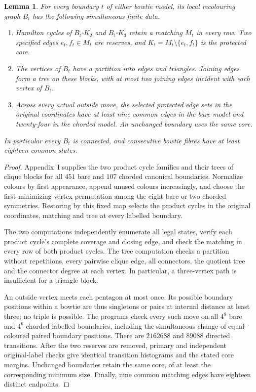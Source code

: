 \documentclass[11pt]{article}
\newtheorem{lemma}[theorem]{Lemma}
\theoremstyle{remark}
\numberwithin{equation}{section}
\numberwithin{table}{section}
\begin{document}
\begin{lemma}\label{lem:bowtie-product-data}
For every boundary $t$ of either bowtie model, its local recolouring
graph $B_t$ has the following simultaneous finite data.
\begin{enumerate}
\item Hamilton cycles of $B_t\square K_2$ and $B_t\square K_3$
retain a matching $M_t$ in every row. Two specified edges
$e_t,f_t\in M_t$ are reserves, and $K_t=M_t\setminus\{e_t,f_t\}$
is the protected core.
\item The vertices of $B_t$ have a partition into edges and triangles.
Joining edges form a tree on these blocks, with at most two joining
edges incident with each vertex of $B_t$.
\item Across every actual outside move, the selected protected edge sets in the original coordinates
have at least nine common edges in the bare model and twenty-four
in the chorded model. An unchanged boundary uses the same core.
\end{enumerate}
In particular every $B_t$ is connected, and consecutive bowtie fibres
have at least eighteen common states.
\end{lemma}
\begin{proof}
Appendix~I supplies the two product cycle families and their
trees of clique blocks for all $451$ bare and $107$ chorded canonical boundaries.
Normalize colours by first appearance, append unused colours increasingly,
and choose the first minimizing vertex permutation among the eight bare or two
chorded symmetries. Restoring by this fixed map selects the product cycles in the original coordinates, matching and tree at every labelled boundary.

The two computations independently enumerate all legal states, verify
each product cycle's complete coverage and closing edge, and check the matching
in every row of both product cycles. The tree computation checks a partition
without repetitions, every pairwise clique edge, all connectors, the
quotient tree and the connector degree at each vertex.
In particular, a three-vertex path is insufficient for a triangle block.

An outside vertex meets each pentagon at most once. Its possible boundary positions
within a bowtie are thus singletons or pairs at internal distance at
least three; no triple is possible. The programs check every such move
on all $4^8$ bare and $4^6$ chorded labelled boundaries, including the
simultaneous change of equal-coloured paired boundary positions. There are
$2162688$ and $89088$ directed transitions. After the two reserves are
removed, primary and independent original-label checks give identical
transition histograms and the stated core margins. Unchanged boundaries
retain the same core, of at least the corresponding minimum size.
Finally, nine common matching edges have eighteen distinct endpoints.
\end{proof}
\end{document}
